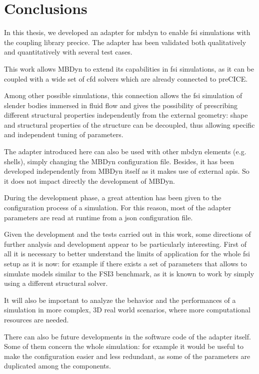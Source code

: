 \chapter{Conclusions}
\label{cha:conclusions}

In this thesis, we  developed an adapter for \acrshort{mbdyn} to enable \acrfull{fsi} simulations with the coupling library \acrshort{precice}.
The adapter has been validated both qualitatively and quantitatively with several test cases.

This work allows MBDyn to extend its capabilities in \acrshort{fsi} simulations, as it can be coupled with a wide set of \acrshort{cfd} solvers which are already connected to preCICE.

Among other possible simulations, this connection allows the \acrshort{fsi} simulation of slender bodies immersed in fluid flow and gives the possibility of prescribing different structural properties independently from the external geometry: shape and structural properties of the structure can be decoupled, thus allowing specific and independent tuning of parameters.

The adapter introduced here can also be used with other \acrshort{mbdyn} elements (e.g. shells), simply changing the MBDyn configuration file. Besides, it has been developed independently from MBDyn itself as it makes use of external \acrshort{api}s. So it does not impact directly the development of MBDyn.

During the development phase, a great attention has been given to the configuration process of a simulation. For this reason, most of the adapter parameters are read at runtime from a \acrshort{json} configuration file.  

Given the development and the tests carried out in this work, some directions of further analysis and development appear to be particularly interesting.
First of all it is necessary to better understand the limits of application for the whole \acrshort{fsi} setup as it is now: for example if there exists a set of parameters that allows to simulate models similar to the FSI3 benchmark, as it is known to work by simply using a different structural solver.

It will also be important to analyze the behavior and the performances of a simulation in more complex, 3D real world scenarios, where more computational resources are needed.

There can also be future developments in the software code of the adapter itself. Some of them concern the whole simulation: for example it would be useful to  make the configuration easier and less redundant, as some of the parameters are duplicated among the components.

